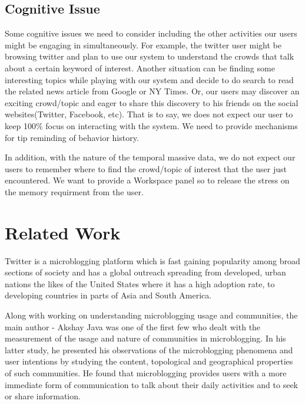 \documentclass{sig-alternate}
\begin{document}
\subsection{Cognitive Issue}
Some cognitive issues we need to consider including the other activities our
users might be engaging in simultaneously. For example, the twitter user might
be browsing twitter and plan to use our system to understand the crowds that
talk about a certain keyword of interest. Another situation can be finding some
interesting topics while playing with our system and decide to do search to
read the related news article from Google or NY Times. Or, our users may
discover an exciting crowd/topic and eager to share this discovery to his
friends on the social websites(Twitter, Facebook, etc). That is to say, we does
not expect our user to keep 100\% focus on interacting with the system. We need
to provide mechanisms for tip reminding of behavior history. 

In addition, with the nature of the temporal massive data, we do not expect our
users to remember where to find the crowd/topic of interest that the user just
encountered. We want to provide a Workspace panel so to release the stress on
the memory requirment from the user.

\section{Related Work}
Twitter is a microblogging platform which is fast gaining popularity
among broad sections of society and has a global outreach spreading from
developed, urban nations the likes of the United States where it has a high
adoption rate\cite{akshayjava2009we}, to developing countries in parts of Asia
and South America.

Along with working on understanding microblogging usage and
communities\cite{java2007we}, the main author - Akshay Java was one of the
first few who dealt with the measurement of the usage and nature of communities
in microblogging. In his latter study\cite{java2008mining}, he presented his
observations of the microblogging phenomena and user intentions by studying the
content, topological and geographical properties of such communities. He found
that microblogging provides users with a more immediate form of communication
to talk about their daily activities and to seek or share information.
\end{document}
